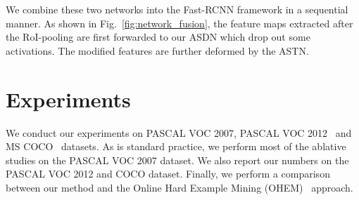 \documentclass[10pt,twocolumn,letterpaper]{article}
\begin{document}
We combine these two networks into the Fast-RCNN framework in a sequential manner. As shown in Fig.~\ref{fig:network_fusion}, the feature maps extracted after the RoI-pooling are first forwarded to our ASDN which drop out some activations. The modified features are further deformed by the ASTN. 








 

\section{Experiments}
\label{sec:exp}

We conduct our experiments on PASCAL VOC 2007, PASCAL VOC 2012~\cite{voc} and MS COCO~\cite{coco} datasets. As is standard practice, we perform most of the ablative studies on the PASCAL VOC 2007 dataset. We also report our numbers on the PASCAL VOC 2012 and COCO dataset. Finally, we perform a comparison between our method and the Online Hard Example Mining (OHEM)~\cite{shrivastavaOHEM} approach. 
\end{document}
